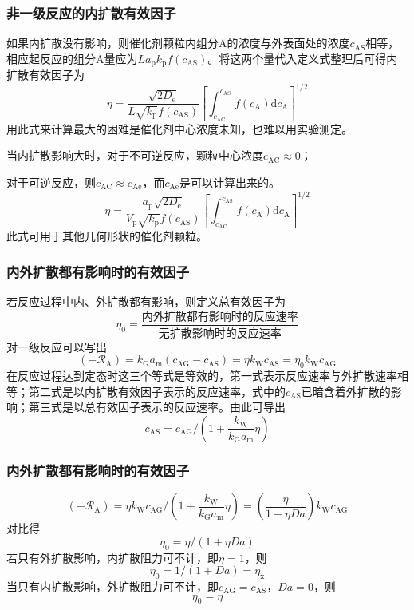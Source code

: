 \documentclass[dvipsnames, svgnames, x11names]{beamer}
\begin{document}
\begin{frame}
    \frametitle{非一级反应的内扩散有效因子}

    如果内扩散没有影响，则催化剂颗粒内组分A的浓度与外表面处的浓度$c_{\mathrm{AS}}$相等，相应起反应的组分A量应为$La_\mathrm{p}k_\mathrm{p}f(c_{\mathrm{AS}})$。将这两个量代入定义式整理后可得内扩散有效因子为
    \[
        \eta=\frac{\sqrt{2 D_{\mathrm{e}}}}{L \sqrt{k_{\mathrm{p}}} f(c_{\mathrm{AS}})}\left[\int_{c_{\mathrm{AC}}}^{c_{\mathrm{AS}}} f(c_{\mathrm{A}}) \mathrm{d} c_{\mathrm{A}}\right]^{1 / 2}
    \]
    用此式来计算最大的困难是催化剂中心浓度未知，也难以用实验测定。
    
    当内扩散影响大时，对于不可逆反应，颗粒中心浓度$c_{\mathrm{AC}} \approx 0$；
    
    对于可逆反应，则$c_{\mathrm{AC}} \approx  c_{\mathrm{Ae}}$，而$c_{\mathrm{Ae}}$是可以计算出来的。
    \[
        \eta=\frac{a_{\mathrm{p}} \sqrt{2 D_{\mathrm{e}}}}{V_{\mathrm{p}} \sqrt{k_{\mathrm{p}}} f(c_{\mathrm{AS}})}\left[\int_{c_{\mathrm{AC}}}^{c_{\mathrm{AS}}} f(c_{\mathrm{A}}) \mathrm{d} c_{\mathrm{A}}\right]^{1 / 2}
    \]
    此式可用于其他几何形状的催化剂颗粒。

\end{frame}


\begin{frame}
    \frametitle{内外扩散都有影响时的有效因子}

    若反应过程中内、外扩散都有影响，则定义总有效因子为
    \[
        \eta_0 = \frac{\text{内外扩散都有影响时的反应速率}}{\text{无扩散影响时的反应速率}}
    \]
    对一级反应可以写出
    \[
        (-\mathscr{R}_{\mathrm{A}})=k_{\mathrm{G}} a_{\mathrm{m}}(c_{\mathrm{AG}}-c_{\mathrm{AS}})=\eta k_{\mathrm{W}} c_{\mathrm{AS}}=\eta_{0} k_{\mathrm{W}} c_{\mathrm{AG}}
    \]
    在反应过程达到定态时这三个等式是等效的，第一式表示反应速率与外扩散速率相等；第二式是以内扩散有效因子表示的反应速率，式中的$c_{\mathrm{AS}}$已暗含着外扩散的影响；第三式是以总有效因子表示的反应速率。由此可导出
    \[
        c_{\mathrm{AS}}=c_{\mathrm{AG}} /\left(1+\frac{k_{\mathrm{W}}}{k_{\mathrm{G}} a_{\mathrm{m}}} \eta\right) 
    \]

\end{frame}


\begin{frame}
    \frametitle{内外扩散都有影响时的有效因子}

    \[
        (-\mathscr{R}_{\mathrm{A}})=\eta k_{\mathrm{W}} c_{\mathrm{AG}} /\left(1+\frac{k_{\mathrm{W}}}{k_{\mathrm{G}} a_{\mathrm{m}}} \eta\right)=\left(\frac{\eta}{1+\eta D a}\right) k_{\mathrm{W}} c_{\mathrm{AG}}
    \]
    对比得
    \[
        \eta_{0}=\eta /(1+\eta D a)
    \]
    若只有外扩散影响，内扩散阻力可不计，即$\eta = 1$，则
    \[
        \eta_{0}=1 /(1+ D a) = \eta_\mathrm{x}
    \]
    当只有内扩散影响，外扩散阻力可不计，即$c_{\mathrm{AG}} = c_{\mathrm{AS}}$，$Da=0$，则
    \[
        \eta_0 = \eta
    \]

\end{frame}
\end{document}
